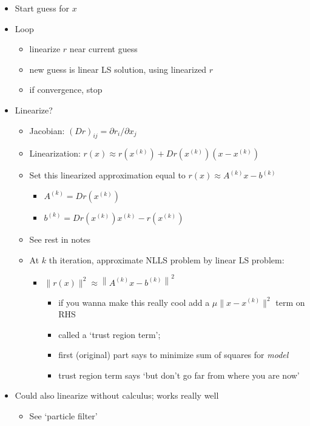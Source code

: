 \documentclass[10pt,letterpaper]{article}
\begin{document}
\begin{itemize}
\item Start guess for $x$
\item Loop

\begin{itemize}
\item linearize $r$ near current guess
\item new guess is linear LS solution, using linearized $r$
\item if convergence, stop
\end{itemize}

\item Linearize?

\begin{itemize}
\item Jacobian: $(Dr) _{ij} = \partial r _{i} / \partial x_j$
\item Linearization: $r (x) \approx r(x ^{(k)}) + Dr(x ^{(k)} ) (x-x ^{(k)} )$
\item Set this linearized approximation equal to $r(x) \approx A ^{(k)} x-b ^{(k)}$

\begin{itemize}
\item $A ^{(k)} = Dr(x ^{(k)})$
\item $b ^{(k)} = Dr (x ^{(k)}) x ^{(k)} -r(x ^{(k)})$
\end{itemize}

\item See rest in notes
\item At $k$ th iteration, approximate NLLS problem by linear LS problem:

\begin{itemize}
\item $\| r (x) \| ^{2} \approx \left\| A ^{(k)} x-b ^{(k)} \right\| ^{2}$

\begin{itemize}
\item if you wanna make this really cool add a $\mu \|x-x ^{(k)} \| ^{2}$ term on RHS
\item called a `trust region term';
\item first (original) part says to minimize sum of squares for \emph{model}
\item trust region term says `but don't go far from where you are now'
\end{itemize}

\end{itemize}

\end{itemize}

\item Could also linearize without calculus; works really well

\begin{itemize}
\item See `particle filter'
\end{itemize}

\end{itemize}
\end{document}
